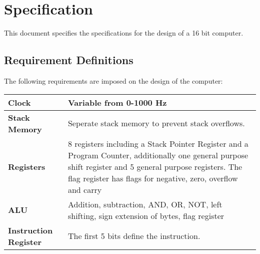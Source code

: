 \documentclass{report}
\begin{document}
\section*{Specification}
This document specifies the specifications for the design of a 16 bit computer.


\subsection*{Requirement Definitions}
The following requirements are imposed on the design of the computer:
\begin{table}[H]
	\centering
	\renewcommand{\arraystretch}{1.2}
	\begin{longtable}{p{}p{}}
		\hline
		\textbf{Clock} & Variable from 0-1000 Hz\\
		\hline
		\textbf{Stack Memory} & Seperate stack memory to prevent stack overflows. \\
		\hline
		\textbf{Registers} & 8 registers including a Stack Pointer Register and a Program Counter, additionally one general purpose shift register and 5 general purpose registers. The flag register has flags for negative, zero, overflow and carry\\
		\hline
		\textbf{ALU} & Addition, subtraction, AND, OR, NOT, left shifting, sign extension of bytes, flag register\\
		\hline
		\textbf{Instruction Register} & The first 5 bits define the instruction.\\
		\hline
	\end{longtable}
\end{table}
\end{document}
